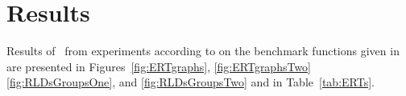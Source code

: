 \documentclass{sig-alternate}
\begin{document}
\section{Results}

Results of \algname\ from experiments according to \cite{biobj2016exp} on the benchmark
functions given in \cite{biobj2016func} are presented in
Figures~\ref{fig:ERTgraphs}, \ref{fig:ERTgraphsTwo} \ref{fig:RLDsGroupsOne}, and \ref{fig:RLDsGroupsTwo} and in
Table~\ref{tab:ERTs}.





\end{document}

